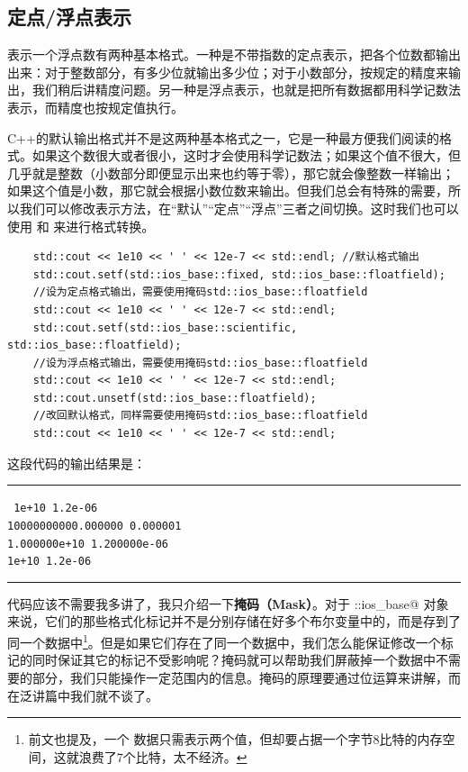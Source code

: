 \subsection*{定点/浮点表示}
表示一个浮点数有两种基本格式。一种是不带指数的定点表示，把各个位数都输出出来：对于整数部分，有多少位就输出多少位；对于小数部分，按规定的精度来输出，我们稍后讲精度问题。另一种是浮点表示，也就是把所有数据都用科学记数法表示，而精度也按规定值执行。\par
C++的默认输出格式并不是这两种基本格式之一，它是一种最方便我们阅读的格式。如果这个数很大或者很小，这时才会使用科学记数法；如果这个值不很大，但几乎就是整数（小数部分即便显示出来也约等于零），那它就会像整数一样输出；如果这个值是小数，那它就会根据小数位数来输出。但我们总会有特殊的需要，所以我们可以修改表示方法，在``默认''``定点''``浮点''三者之间切换。这时我们也可以使用 \lstinline@setf@ 和 \lstinline@unsetf@ 来进行格式转换。
\begin{lstlisting}
    std::cout << 1e10 << ' ' << 12e-7 << std::endl; //默认格式输出
    std::cout.setf(std::ios_base::fixed, std::ios_base::floatfield);
    //设为定点格式输出，需要使用掩码std::ios_base::floatfield
    std::cout << 1e10 << ' ' << 12e-7 << std::endl;
    std::cout.setf(std::ios_base::scientific, std::ios_base::floatfield);
    //设为浮点格式输出，需要使用掩码std::ios_base::floatfield
    std::cout << 1e10 << ' ' << 12e-7 << std::endl;
    std::cout.unsetf(std::ios_base::floatfield);
    //改回默认格式，同样需要使用掩码std::ios_base::floatfield
    std::cout << 1e10 << ' ' << 12e-7 << std::endl;
\end{lstlisting}\newpage
这段代码的输出结果是：\\\noindent\rule{\linewidth}{.2pt}\texttt{
1e+10 1.2e-06\\
10000000000.000000 0.000001\\
1.000000e+10 1.200000e-06\\
1e+10 1.2e-06
}\\\noindent\rule{\linewidth}{.2pt}\par
代码应该不需要我多讲了，我只介绍一下\textbf{掩码（Mask）}。对于 \lstinline@std::ios_base@ 对象来说，它们的那些格式化标记并不是分别存储在好多个布尔变量中的，而是存到了同一个数据中\footnote{前文也提及，一个 \lstinline@bool@ 数据只需表示两个值，但却要占据一个字节8比特的内存空间，这就浪费了7个比特，太不经济。}。但是如果它们存在了同一个数据中，我们怎么能保证修改一个标记的同时保证其它的标记不受影响呢？掩码就可以帮助我们屏蔽掉一个数据中不需要的部分，我们只能操作一定范围内的信息。掩码的原理要通过位运算来讲解，而在泛讲篇中我们就不谈了。\par
